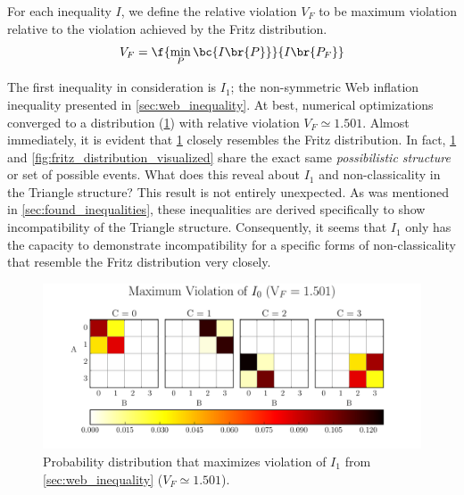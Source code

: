 \documentclass[aps, 10pt, english, twoside, pra, nofootinbib, tightenlines, longbibliography, superscriptaddress]{revtex4-1}
\begin{document}
    For each inequality $I$, we define the relative violation $V_F$ to be maximum violation relative to the violation achieved by the Fritz distribution.
    \[ V_F = \f{\min_{P}\bc{I\br{P}}}{I\br{P_F}} \]

    The first inequality in consideration is $I_1$; the non-symmetric Web inflation inequality presented in \cref{sec:web_inequality}. At best, numerical optimizations converged to a distribution (\cref{fig:maximum_violation_I_1}) with relative violation $V_F \simeq 1.501$. Almost immediately, it is evident that \cref{fig:maximum_violation_I_1} closely resembles the Fritz distribution. In fact, \cref{fig:maximum_violation_I_1} and \cref{fig:fritz_distribution_visualized} share the exact same \textit{possibilistic structure} or set of possible events. What does this reveal about $I_1$ and non-classicality in the Triangle structure? This result is not entirely unexpected. As was mentioned in \cref{sec:found_inequalities}, these inequalities are derived specifically to show incompatibility of the Triangle structure. Consequently, it seems that $I_1$ only has the capacity to demonstrate incompatibility for a specific forms of non-classicality that resemble the Fritz distribution very closely.

    \begin{figure}
    \begin{center}
            \includegraphics[scale=0.6,trim={0 0 0 0.4in},clip]{../../figures/distributions/plotted_dist_I_1_max_violation_2017.pdf}
            \caption{Probability distribution that maximizes violation of $I_1$ from \cref{sec:web_inequality} ($V_F \simeq 1.501$).}
            \label{fig:maximum_violation_I_1}
    \end{center}
    \end{figure}
\end{document}
